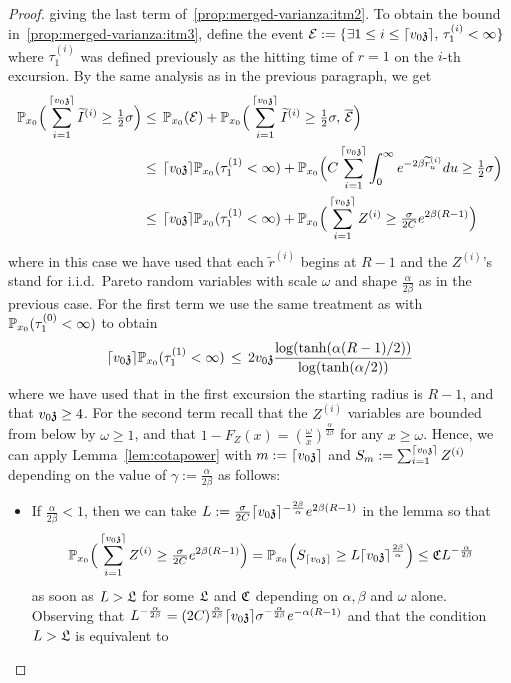 \begin{proof}
giving the last term of~\eqref{prop:merged-varianza:itm2}. To obtain the bound in~\eqref{prop:merged-varianza:itm3}, define the event $\mathcal{E}:=\{\exists 1\leq i\leq \lceil v_0\ss\rceil,\,\tau_1^{(i)}<\infty\}$ where $\tau_1^{(i)}$ was defined previously as the hitting time of $r=1$ on the $i$-th excursion. By the same analysis as in the previous paragraph, we get 
\begin{align*}\PP_{x_0}\Big(\sum_{i=1}^{\lceil v_0\ss\rceil}\tI^{(i)}\geq\tfrac12\sigma\Big)&\leq\,\PP_{x_0}(\mathcal{E})+\PP_{x_0}\Big(\sum_{i=1}^{\lceil v_0\ss\rceil}\tI^{(i)}\geq\tfrac12\sigma,\,\overline{\mathcal{E}}\Big)\\&\leq\,\lceil v_0\ss\rceil\PP_{x_0}(\tau_{1}^{(1)}<\infty)+\PP_{x_0}\Big(C\sum_{i=1}^{\lceil v_0\ss\rceil}\int_0^{\infty}e^{-2\beta\widetilde{r}^{(i)}_u}du\geq\tfrac12\sigma\Big)\\&\leq\,\lceil v_0\ss\rceil\PP_{x_0}(\tau_{1}^{(1)}<\infty)+\PP_{x_0}\Big(\sum_{i=1}^{\lceil v_0\ss\rceil}Z^{(i)}\geq\tfrac{\sigma}{2C}e^{2\beta(R-1)}\Big)\end{align*}
where in this case we have used that each $\widetilde{r}^{(i)}$ begins at $R-1$ and the $Z^{(i)}$'s stand for i.i.d.~Pareto random variables with scale $\omega$ and shape $\frac{\alpha}{2\beta}$ as in the previous case. For the first term we use the same treatment as with $\PP_{x_0}(\tau_{1}^{(0)}<\infty)$ to obtain
\[\lceil v_0\ss\rceil\PP_{x_0}(\tau_{1}^{(1)}<\infty)\,\leq\,2v_0\ss\frac{\log(\tanh(\alpha (R-1)/2))}{\log(\tanh(\alpha/2))}\]
where we have used that in the first excursion the starting radius is $R-1$, and that $v_0\ss\geq 4$. For the second term recall that the $Z^{(i)}$ variables are bounded from below by $\omega\geq 1$, and that $1-F_Z(x)=(\frac{\omega}{x})^{\frac{\alpha}{2\beta}}$ for any $x\geq\omega$. Hence, we can apply Lemma~\ref{lem:cotapower} with $m:=\lceil v_0\ss\rceil$ and $S_m:=\sum_{i=1}^{\lceil v_0\ss\rceil} Z^{(i)}$ depending on the value of $\gamma:=\frac{\alpha}{2\beta}$ as follows:
\begin{itemize}
\item If $\frac{\alpha}{2\beta}<1$, then we can take $L:=\tfrac{\sigma}{2C}\lceil v_0\ss\rceil^{-\frac{2\beta}{\alpha}}e^{2\beta(R-1)}$ in the lemma so that 
\[\PP_{x_0}\Big(\sum_{i=1}^{\lceil v_0\ss\rceil}Z^{(i)}\ge\tfrac{\sigma}{2C}e^{2\beta(R-1)}\Big)=\PP_{x_0}\Big(S_{\lceil v_0\ss\rceil}\ge L \lceil v_0\ss\rceil^{\frac{2\beta}{\alpha}}\Big)\leq \auxc L^{-\frac{\alpha}{2\beta}}\]
as soon as $L> \auxl$ for some $\auxl$ and $\auxc$ depending on $\alpha,\beta$ and $\omega$ alone. Observing that $L^{-\frac{\alpha}{2\beta}}=(2C)^{\frac{\alpha}{2\beta}}\lceil v_0\ss\rceil\sigma^{-\frac{\alpha}{2\beta}}e^{-\alpha (R-1)}$ and that the condition $L> \auxl$ is equivalent to

\end{itemize}
\end{proof}
